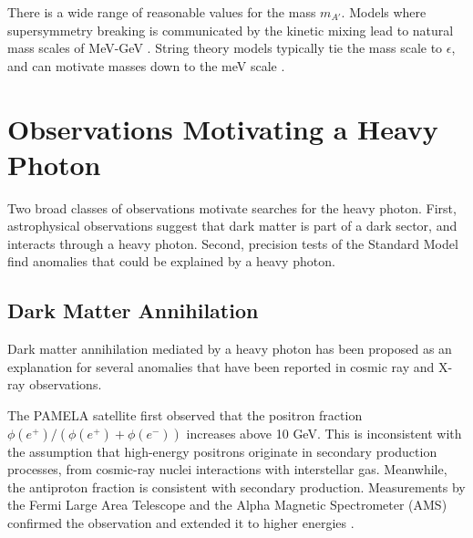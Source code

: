 There is a wide range of reasonable values for the mass $m_{A'}$.
Models where supersymmetry breaking is communicated by the kinetic mixing lead to natural mass scales of MeV-GeV \cite{baumgart_non-abelian_2009, morrissey_abelian_2009, cheung_kinetic_2009}.
String theory models typically tie the mass scale to $\epsilon$, and can motivate masses down to the meV scale \cite{goodsell_naturally_2009,cicoli_testing_2011}.

%


%
%

\section{Observations Motivating a Heavy Photon}

Two broad classes of observations motivate searches for the heavy photon.
First, astrophysical observations suggest that dark matter is part of a dark sector, and interacts through a heavy photon.
Second, precision tests of the Standard Model find anomalies that could be explained by a heavy photon.

\subsection{Dark Matter Annihilation}

Dark matter annihilation mediated by a heavy photon has been proposed as an explanation for several anomalies that have been reported in cosmic ray and X-ray observations.

The PAMELA satellite first observed that the positron fraction $\phi(e^+)/(\phi(e^+)+\phi(e^-))$ increases above 10 GeV.
This is inconsistent with the assumption that high-energy positrons originate in secondary production processes, from cosmic-ray nuclei interactions with interstellar gas.
Meanwhile, the antiproton fraction is consistent with secondary production.
Measurements by the Fermi Large Area Telescope and the Alpha Magnetic Spectrometer (AMS) confirmed the observation and extended it to higher energies \cite{the_fermi_lat_collaboration_measurement_2012,ams_collaboration_first_2013}.

